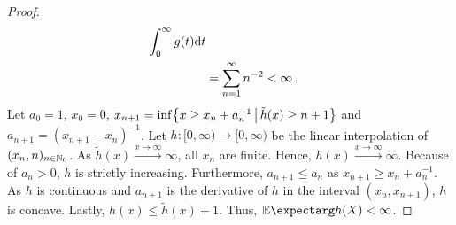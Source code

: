 \begin{proof}
\begin{align*}
		\int_0^\infty g(t) \mathrm{d} t
		\\&=
		\sum_{n=1}^\infty n^{-2}
		<
		\infty
		\, .
	\end{align*}
	Let $a_0 = 1$, $x_0=0$, $x_{n+1} = \inf\mathopen{}\left\lbrace x \geq x_n + a_n^{-1} \,\big\vert\, \tilde h(x) \geq n+1 \right\rbrace\mathclose{}$ and $a_{n+1} = (x_{n+1} - x_n)^{-1}$. Let $h \colon [0,\infty) \to [0,\infty)$ be the linear interpolation of $(x_n, n)_{n\in\mathbb{N}_0}$. 
	As $\tilde h(x) \xrightarrow{x\to\infty}\infty$, all $x_n$ are finite. Hence, $h(x) \xrightarrow{x\to\infty}\infty$. 
	Because of $a_n > 0$, $h$ is strictly increasing.
	Furthermore, $a_{n+1} \leq a_n$ as $x_{n+1} \geq x_n + a_n^{-1}$. As $h$ is continuous and $a_{n+1}$ is the derivative of $h$ in the interval $(x_n, x_{n+1})$, $h$ is concave.
	Lastly, $h(x) \leq \tilde h(x) + 1$. Thus, $\Ex{h(X)} < \infty$.
\end{proof}
%
